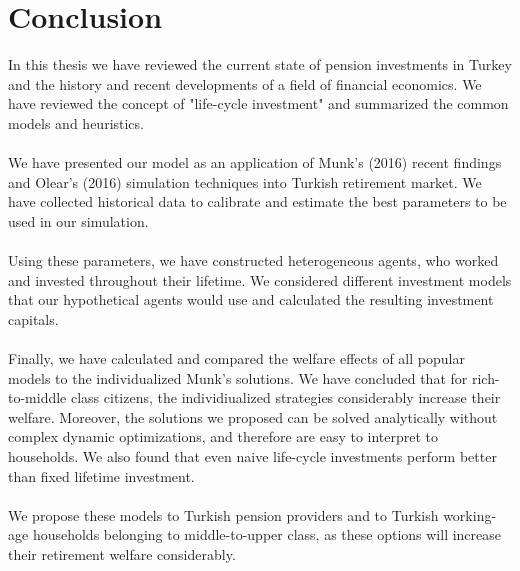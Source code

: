 \documentclass[]{elsarticle}
\begin{document}
\begin{table}
\begin{tabular}[c]{lrrrr}
		\hline
	\end{tabular}
\end{table}


\section{Conclusion}
\label{conclusion}

In this thesis we have reviewed the current state of pension investments in Turkey and the history and recent developments of a field of financial economics. We have reviewed the concept of "life-cycle investment" and summarized the common models and heuristics.

\paragraph{}We have presented our model as an application of Munk's (2016) recent findings and Olear's (2016) simulation techniques into Turkish retirement market. We have collected historical data to calibrate and estimate the best parameters to be used in our simulation.

\paragraph{}Using these parameters, we have constructed heterogeneous agents, who worked and invested throughout their lifetime. We considered different investment models that our hypothetical agents would use and calculated the resulting investment capitals.

\paragraph{}Finally, we have calculated and compared the welfare effects of all popular models to the individualized Munk's solutions. We have concluded that for rich-to-middle class citizens, the individiualized strategies considerably increase their welfare. Moreover, the solutions we proposed can be solved analytically without complex dynamic optimizations, and therefore are easy to interpret to households. We also found that even naive life-cycle investments perform better than fixed lifetime investment.

\paragraph{}We propose these models to Turkish pension providers and to Turkish working-age households belonging to middle-to-upper class, as these options will increase their retirement welfare considerably.
\end{document}
